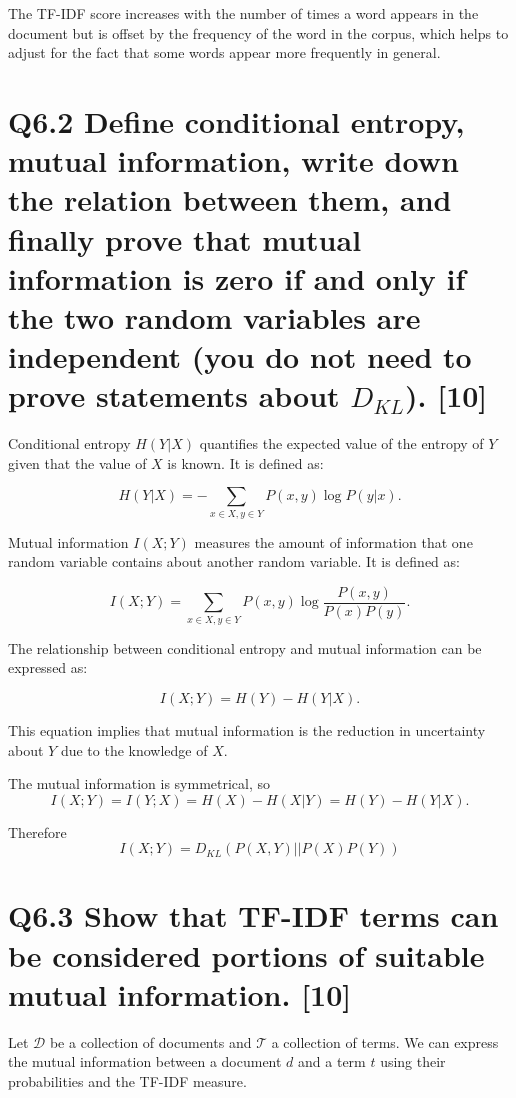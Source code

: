 \documentclass[11pt]{article}
\begin{document}
The TF-IDF score increases with the number of times a word appears in the document but is offset by the frequency of the word in the corpus, which helps to adjust for the fact that some words appear more frequently in general.

\section{Q6.2 Define conditional entropy, mutual information, write down the relation between them, and finally prove that mutual information is zero if and only if the two random variables are independent (you do not need to prove statements about $D_{KL}$). [10]}

Conditional entropy $H(Y|X)$ quantifies the expected value of the entropy of $Y$ given that the value of $X$ is known. It is defined as:

\[
H(Y|X) = -\sum_{x \in X, y \in Y} P(x, y) \log P(y|x).
\]

Mutual information $I(X; Y)$ measures the amount of information that one random variable contains about another random variable. It is defined as:

\[
I(X; Y) = \sum_{x \in X, y \in Y} P(x, y) \log \frac{P(x, y)}{P(x)P(y)}.
\]

The relationship between conditional entropy and mutual information can be expressed as:

\[
I(X; Y) = H(Y) - H(Y|X).
\]

This equation implies that mutual information is the reduction in uncertainty about $Y$ due to the knowledge of $X$.

The mutual information is symmetrical, so
\[
I(X; Y) = I(Y; X) = H(X) - H(X|Y) = H(Y) - H(Y|X).
\]

Therefore
\[
    I(X;Y) = D_{KL}(P(X,Y)||P(X)P(Y))
\]

\section{Q6.3 Show that TF-IDF terms can be considered portions of suitable mutual information. [10]}

Let $\mathcal{D}$ be a collection of documents and $\mathcal{T}$ a collection of terms. We can express the mutual information between a document $d$ and a term $t$ using their probabilities and the TF-IDF measure.
\end{document}
